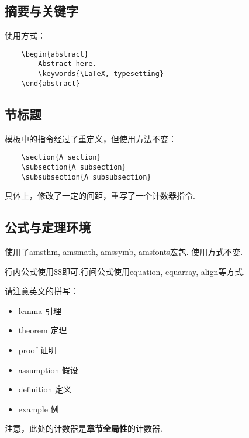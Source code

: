 \documentclass[bwprint, withouttitlepage]{mathexpthesis}
\begin{document}
\subsection{摘要与关键字}
使用方式：
\begin{verbatim}
    \begin{abstract}
        Abstract here.
        \keywords{\LaTeX, typesetting}
    \end{abstract}
\end{verbatim}

\subsection{节标题}
模板中的指令经过了重定义，但使用方法不变：
\begin{verbatim}
    \section{A section}
    \subsection{A subsection}
    \subsubsection{A subsubsection}
\end{verbatim}

具体上，修改了一定的间距，重写了一个计数器指令.

\subsection{公式与定理环境}
使用了amsthm, amsmath, amssymb, amsfonts宏包. 使用方式不变.

行内公式使用\$\$即可.行间公式使用equation, equarray, align等方式.

请注意英文的拼写：
\begin{itemize}[itemindent=2em]
    \item lemma 引理
    \item theorem 定理
    \item proof 证明
    \item assumption 假设
    \item definition 定义
    \item example 例
\end{itemize}

注意，此处的计数器是\textbf{章节全局性}的计数器.
\end{document}
